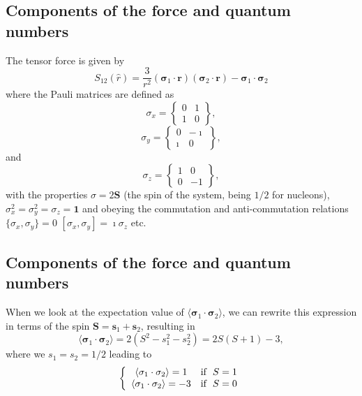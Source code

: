 \documentclass[%
twoside,                 %
final,                   %
10pt]{article}
\begin{document}
\subsection{Components of the force and quantum numbers}
\begin{block}{}
The tensor force is given by
\[
S_{12} (\hat r) = \frac{3}{r^2}\left(\mathbf{\sigma}_1\cdot \mathbf{r}\right) \left(\mathbf{\sigma}_2\cdot \mathbf{r}\right) -\mathbf{\sigma}_1\cdot\mathbf{\sigma}_2\]
where the Pauli matrices are defined as
\[
\sigma_x =\begin{Bmatrix} 0 & 1 \\ 1 & 0 \end{Bmatrix},
\]
\[
\sigma_y =\begin{Bmatrix} 0 & -\imath \\ \imath & 0 \end{Bmatrix},
\]
and
\[
\sigma_z =\begin{Bmatrix} 1 & 0 \\ 0 & -1 \end{Bmatrix},
\]
with the properties $\sigma = 2\mathbf{S}$ (the spin of the system, being $1/2$ for nucleons), 
$\sigma^2_x=\sigma^2_y=\sigma_z=\mathbf{1}$ and
obeying the commutation and anti-commutation relations $\{\sigma_x,\sigma_y\} =0$
$[\sigma_x,\sigma_y] =\imath\sigma_z$ etc.
\end{block}

\subsection{Components of the force and quantum numbers}
\begin{block}{}
When we look at the expectation value of 
$\langle \mathbf{\sigma}_1\cdot\mathbf{\sigma}_2\rangle$, we can rewrite this expression in terms of the
spin $\mathbf{S}=\mathbf{s}_1+\mathbf{s}_2$, resulting in 
\[
\langle\mathbf{\sigma}_1\cdot\mathbf{\sigma}_2\rangle=2(S^2-s_1^2-s_2^2)=2S(S+1)-3,
\]
where we $s_1=s_2=1/2$ leading to
\[
\left\{ \begin{array}{cc} \langle\mathbf{\sigma}_1\cdot\mathbf{\sigma}_2\rangle=1 &  \mathrm{if} \hspace{0.2cm} S=1\\
\langle\mathbf{\sigma}_1\cdot\mathbf{\sigma}_2\rangle=-3 & \mathrm{if} \hspace{0.2cm} S=0\\\end{array}\right.
\]
\end{block}
\end{document}
